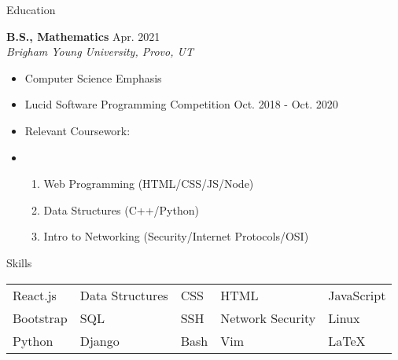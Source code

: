 \documentclass{resume} %
\begin{document}
\begin{rSection}{Education}

{\bf B.S., Mathematics }\hfill {Apr. 2021} \\
\textit{Brigham Young University, Provo, UT}
    \begin{itemize}
        \item Computer Science Emphasis
        \item Lucid Software Programming Competition       \hfill {Oct. 2018 - Oct. 2020}
        \item Relevant Coursework:
        \item[]
            \begin{enumerate}
                \item[] Web Programming (HTML/CSS/JS/Node)
                \item[] Data Structures (C++/Python)
                \item[] Intro to Networking (Security/Internet Protocols/OSI)
            \end{enumerate}
    \end{itemize}
\end{rSection}

\begin{rSection}{Skills}
        \begin{tabular}{ l l l l l }
            React.js    & Data Structures & CSS & HTML & JavaScript \\
            Bootstrap   & SQL             & SSH  & Network Security & Linux  \\
            Python      & Django          & Bash         & Vim & \LaTeX  
        \end{tabular}
\end{rSection}
\end{document}
